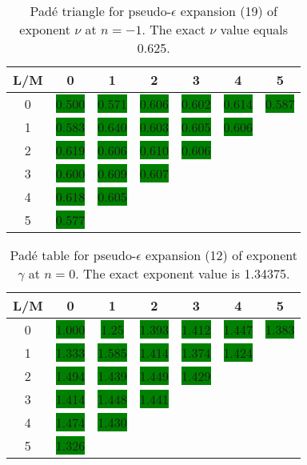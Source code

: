 \documentclass[preprint,preprintnumbers,amsmath,amssymb]{revtex4}
\newcommand{\green}[1]{\colorbox{green}{#1}}%
\begin{document}
\begin{table}[t]
\caption{Pad\'e triangle for pseudo-$\epsilon$ expansion (19) of exponent
$\nu$ at $n = -1$. The exact $\nu$ value equals 0.625.}
\label{tab3}
\renewcommand{\tabcolsep}{0.4cm}
\begin{tabular}{|*{7}{c|}}
              \hline
              L/M & 0 & 1 & 2 & 3 & 4 & 5 \\ \hline
              0 & \green{0.500} & \green{0.571} & \green{0.606} & \green{0.602} & \green{0.614} & \green{0.587} \\ \hline
              1 & \green{0.583} & \green{0.640} & \green{0.603} & \green{0.605} & \green{0.606} &      \\ \hline
              2 & \green{0.619} & \green{0.606} & \green{0.610} & \green{0.606} &     &      \\ \hline
              3 & \green{0.600} & \green{0.609} & \green{0.607} &      &     &      \\ \hline
              4 & \green{0.618} & \green{0.605} &      &      &     &      \\ \hline
              5 & \green{0.577} &       &      &      &     & 
               \\ \hline
\end{tabular}
\end{table}

\begin{table}[t]
\caption{Pad\'e table for pseudo-$\epsilon$ expansion (12) of exponent $\gamma$
at $n = 0$. The exact exponent value is 1.34375.}
\label{tab4}
\renewcommand{\tabcolsep}{0.4cm}
\begin{tabular}{|*{7}{c|}}
              \hline
              L/M & 0 & 1 & 2 & 3 & 4 & 5 \\ \hline
              0 & \green{1.000} & \green{1.25 } & \green{1.393} & \green{1.412} & \green{1.447} & \green{1.383} \\ \hline
              1 & \green{1.333} & \green{1.585} & \green{1.414} & \green{1.374} & \green{1.424} &       \\ \hline
              2 & \green{1.494} & \green{1.439} & \green{1.449} & \green{1.429} &       &       \\ \hline
              3 & \green{1.414} & \green{1.448} & \green{1.441} &       &       &       \\ \hline
              4 & \green{1.474} & \green{1.430} &       &       &       &       \\ \hline
              5 & \green{1.326} &       &       &       &       &
               \\ \hline
\end{tabular}
\end{table}
\end{document}
